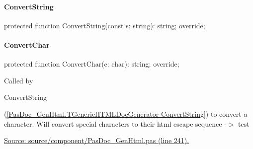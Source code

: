 \documentclass{report}
\newif\ifpdf
\begin{document}
\paragraph*{ConvertString}\hspace*{\fill}

\label{PasDoc_GenHtml.TGenericHTMLDocGenerator-ConvertString}
\begin{list}{}{
\setlength{\itemindent}{0cm}
\setlength{\listparindent}{0cm}
\setlength{\leftmargin}{\evensidemargin}
\addtolength{\leftmargin}{\tmplength}
\settowidth{\labelsep}{X}
\addtolength{\leftmargin}{\labelsep}
\setlength{\labelwidth}{\tmplength}
}
\item[\textbf{Declaration}\hfill]
\ifpdf
\begin{flushleft}
\fi
\begin{ttfamily}
protected function ConvertString(const s: string): string; override;\end{ttfamily}

\ifpdf
\end{flushleft}
\fi

\end{list}
\paragraph*{ConvertChar}\hspace*{\fill}

\label{PasDoc_GenHtml.TGenericHTMLDocGenerator-ConvertChar}
\begin{list}{}{
\setlength{\itemindent}{0cm}
\setlength{\listparindent}{0cm}
\setlength{\leftmargin}{\evensidemargin}
\addtolength{\leftmargin}{\tmplength}
\settowidth{\labelsep}{X}
\addtolength{\leftmargin}{\labelsep}
\setlength{\labelwidth}{\tmplength}
}
\item[\textbf{Declaration}\hfill]
\ifpdf
\begin{flushleft}
\fi
\begin{ttfamily}
protected function ConvertChar(c: char): string; override;\end{ttfamily}

\ifpdf
\end{flushleft}
\fi

\par
\item[\textbf{Description}]
Called by \begin{ttfamily}ConvertString\end{ttfamily}(\ref{PasDoc_GenHtml.TGenericHTMLDocGenerator-ConvertString}) to convert a character. Will convert special characters to their html escape sequence {-}{$>$} test\par
\href{https://github.com/pasdoc/pasdoc/blob/master/source/component/PasDoc_GenHtml.pas#L241}{Source: source/component/PasDoc{\_}GenHtml.pas (line 241).}

\end{list}
\end{document}
